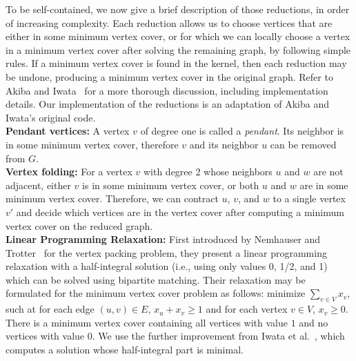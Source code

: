 \documentclass[twoside,leqno,twocolumn]{article}
\begin{document}
To be self-contained, we now give a brief description of those reductions, in order of increasing complexity. Each reduction allows us to choose vertices that are either in some minimum vertex cover, or for which we can locally choose a vertex in a minimum vertex cover after solving the remaining graph, by following simple rules. If a minimum vertex cover  is found in the kernel, then each reduction may be undone, producing a minimum vertex cover in the original graph. Refer to Akiba and Iwata~\cite{akiba-tcs-2016} for a more thorough discussion, including implementation details. Our implementation of the reductions is an adaptation of Akiba and Iwata's original code. \\

\noindent\textbf{Pendant vertices:} A vertex $v$ of degree one is called a \emph{pendant}. Its neighbor is in some minimum vertex cover, therefore $v$ and its neighbor $u$ can be removed from $G$. \\


\noindent\textbf{Vertex folding:} For a vertex $v$ with degree 2 whose neighbors $u$ and $w$ are not adjacent, either $v$ is in some minimum vertex cover, or both $u$ and $w$ are in some minimum vertex cover. Therefore, we can contract $u$, $v$, and $w$ to a single vertex $v'$ and decide which vertices are in the vertex cover after computing a minimum vertex cover on the reduced graph. \\

\noindent\textbf{Linear Programming Relaxation:}
First introduced by Nemhauser and Trotter~\cite{nemhauser-1975} for the vertex
packing problem, they present a linear programming relaxation with a
half-integral solution (i.e., using only values 0, 1/2, and 1) which can be
solved using bipartite matching. Their relaxation may be formulated for the
minimum vertex cover problem as follows: minimize $\sum_{v\in V}{x_v}$, such at
for each edge $(u, v) \in E$, $x_u + x_v \geq 1$ and for each vertex $v \in V$,
$x_v \geq 0$. There is a minimum vertex cover containing all vertices with value
$1$ and no vertices with value $0$. We use the further improvement from Iwata et al.~\cite{iwata-2014}, which computes a solution whose half-integral part is minimal. \\
\end{document}
